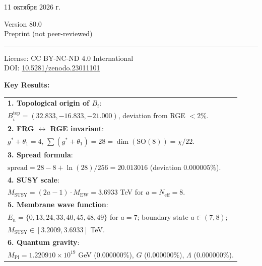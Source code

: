 \documentclass[11pt,a4paper]{article}
\newcommand{\SO}{\ensuremath{\mathrm{SO}}}
\theoremstyle{definition}
\begin{document}
\begin{titlepage}
{\large
11 октября 2026 г.
\par}

\vspace{1.5cm}

{\large
Version 80.0 \\[0.3em]
Preprint (not peer-reviewed)
\par}

\vspace{1.5cm}
\rule{0.5\textwidth}{0.4pt}
\vspace{0.5cm}

{\small
License: CC BY-NC-ND 4.0 International \\[0.2em]
DOI: \href{https://doi.org/10.5281/zenodo.23011101}{10.5281/zenodo.23011101}
\par}

\vfill

{\small\bfseries Key Results: \par}
\vspace{0.3cm}
{\small
\begin{tabular}{p{}}
\toprule
\textbf{1. Topological origin of $B_i$}: \\
\hspace{1em}$B_i^{\text{top}} = (32.833, -16.833, -21.000)$, deviation from RGE $< 2\%$. \\[0.4em]

\textbf{2. FRG $\leftrightarrow$ RGE invariant}: \\
\hspace{1em}$g^* + \theta_1 = 4$, $\sum(g^*+\theta_1) = 28 = \dim(\SO(8)) = \chi/22$. \\[0.4em]

\textbf{3. Spread formula}: \\
\hspace{1em}$\text{spread} = 28 - 8 + \ln(28)/256 = 20.013016$ (deviation $0.000005\%$). \\[0.4em]

\textbf{4. SUSY scale}: \\
\hspace{1em}$M_{\text{SUSY}} = (2a-1) \cdot M_{\text{EW}} = 3.6933$ TeV for $a = N_{\text{eff}} = 8$. \\[0.4em]

\textbf{5. Membrane wave function}: \\
\hspace{1em}$E_n = \{0, 13, 24, 33, 40, 45, 48, 49\}$ for $a = 7$; boundary state $a \in (7,8)$; \\
\hspace{1em}$M_{\text{SUSY}} \in [3.2009, 3.6933]$ TeV. \\[0.4em]

\textbf{6. Quantum gravity}: \\
\hspace{1em}$M_{\text{Pl}} = 1.220910 \times 10^{19}$ GeV ($0.000000\%$), $G$ ($0.000000\%$), $\Lambda$ ($0.000000\%$). \\[0.4em]
\bottomrule
\end{tabular}
\par}

\vfill
\thispagestyle{empty}
\end{titlepage}
\end{document}
